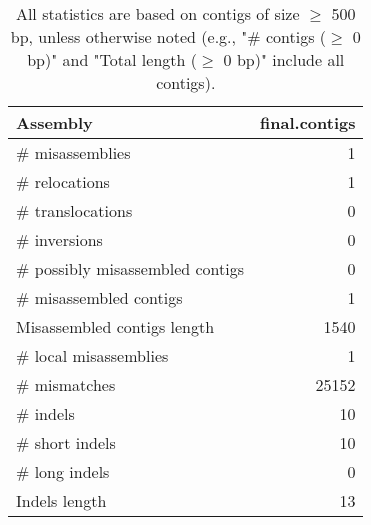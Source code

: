 \documentclass[12pt,a4paper]{article}
\begin{document}
\begin{table}[ht]
\begin{center}
\caption{All statistics are based on contigs of size $\geq$ 500 bp, unless otherwise noted (e.g., "\# contigs ($\geq$ 0 bp)" and "Total length ($\geq$ 0 bp)" include all contigs).}
\begin{tabular}{|l*{1}{|r}|}
\hline
Assembly & final.contigs \\ \hline
\# misassemblies & 1 \\ \hline
\hspace{5mm}\# relocations & 1 \\ \hline
\hspace{5mm}\# translocations & 0 \\ \hline
\hspace{5mm}\# inversions & 0 \\ \hline
\# possibly misassembled contigs & 0 \\ \hline
\# misassembled contigs & 1 \\ \hline
Misassembled contigs length & 1540 \\ \hline
\# local misassemblies & 1 \\ \hline
\# mismatches & 25152 \\ \hline
\# indels & 10 \\ \hline
\hspace{5mm}\# short indels & 10 \\ \hline
\hspace{5mm}\# long indels & 0 \\ \hline
Indels length & 13 \\ \hline
\end{tabular}
\end{center}
\end{table}
\end{document}
